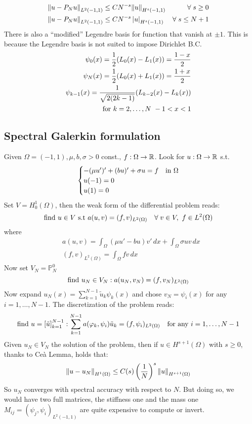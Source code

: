 \begin{align*}
    \norm{u-P_Nu}_{L^2(-1,1)} &\leq CN^{-s} \norm{u}_{H^s(-1,1)} & \forall \; s \geq 0 \\
    \norm{u-P_Nu}_{L^2(-1,1)} &\leq CN^{-s} \left\lvert u\right\rvert_{H^s(-1,1)} & \forall \; s \leq N+1 \\
\end{align*}
There is also a ``modified'' Legendre basis for function that vanish at \(\pm 1\). This is because the Legendre basis is not suited to impose Dirichlet B.C.
\begin{align*}
    \psi_0(x) = \frac{1}{2} (L_0(x) - L_1(x)) = \frac{1-x}{2} \\ 
    \psi_N(x) = \frac{1}{2} (L_0(x) + L_1(x)) = \frac{1+x}{2} \\ 
    \psi_{k-1}(x) = \frac{1}{\sqrt{2(2k-1)}} (L_{k-2}(x) - L_k(x))\\ 
    \text{for } k = 2, \ldots, N \ -1 < x < 1 \\ 
\end{align*}

\subsection{Spectral Galerkin formulation}
Given \(\Omega = (-1, 1), \mu, b, \sigma > 0\) const., \(f: \Omega \to \mathbb{R}\). Look for \(u:\Omega \to \mathbb{R}\) s.t. 
\[
    \begin{cases}
        -(\mu u')'+(bu)' + \sigma u = f & \text{in } \Omega \\
        u(-1) = 0 \\
        u(1) = 0
    \end{cases}
\]
Set \(V  = H^1_0(\Omega)\), then the weak form of the differential problem reads: 
\[
    \text{find } u \in V \text{ s.t } a(u,v) = (f,v)_{L^2(\Omega)} \quad \forall \; v \in V, \ f \in L^2(\Omega)
\]
where 
\begin{align*}
    & a(u,v) = \int_{\Omega} (\mu u' - bu)v'\, dx + \int_{\Omega} \sigma uv \, dx \\
    & (f,v)_{L^2(\Omega)} = \int_{\Omega} f v \, dx
\end{align*}
Now set \(V_N = \mathbb{P}^0_N\) 
\begin{equation}
    \text{find } u_N \in V_N: a(u_N, v_N) = (f, v_N)_{L^2(\Omega)} \label{weak_spec_galerkin_formulation}
\end{equation}
Now expand \(u_N(x) = \sum_{k=1}^{N-1} \tilde{u}_k \psi_k(x)\) and chose \(v_N = \psi_i(x)\) for any \(i = 1, \ldots, N-1\).
The discretization of the problem reads:
\[
    \text{find } u = \left[\tilde{u}\right]_{k=1}^{N-1} : \sum_{k=1}^{N-1} a(\varphi_k, \psi_i)\tilde{u}_k = (f, \psi_i)_{L^2(\Omega)} \quad \text{for any } i = 1, \ldots, N-1
\]
Given \(u_N \in V_N\) the solution of the problem, then if \(u \in H^{s+1}(\Omega)\) with \(s \geq 0\), thanks to Ceà Lemma, holds that:
\[
    \norm{u-u_N}_{H^1(\Omega)} \leq C(s)\left(\frac{1}{N}\right)^s\norm{u}_{H^{s+1}(\Omega)}
\]
So \(u_N\) converges with spectral accuracy with respect to \(N\).
But doing so, we would have two full matrices, the stiffness one and the mass one  \(M_{ij} = (\psi_j, \psi_i)_{L^2(-1,1)}\) are quite expensive to compute or invert.

